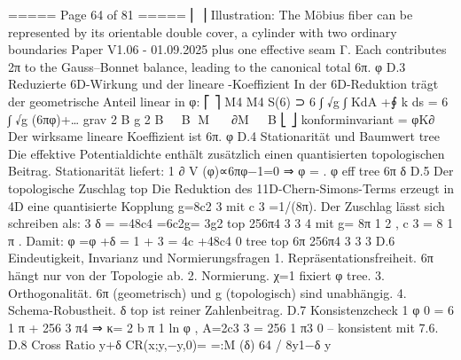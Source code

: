\begin{MyVerbatim}
{{===== Page 64 of 81 =====
⎢ ⎥
Illustration: The Möbius fiber can be represented by its orientable double cover, a cylinder with two ordinary boundaries
Paper V1.06 - 01.09.2025
plus one effective seam Γ. Each contributes 2π to the Gauss–Bonnet balance, leading to the canonical total 6π.
φ
D.3 Reduzierte 6D-Wirkung und der lineare -Koeffizient
In der 6D-Reduktion trägt der geometrische Anteil linear in φ:
⎡ ⎤
M4 M4
S(6) ⊃ 6 ∫ √g ∫ KdA +∮ k ds = 6 ∫ √g (6πφ)+…
grav 2 B g 2 B
B M  ∂M  B
⎣ ⎦
konforminvariant = φK∂
Der wirksame lineare Koeffizient ist 6π.
φ
D.4 Stationarität und Baumwert
tree
Die effektive Potentialdichte enthält zusätzlich einen quantisierten topologischen Beitrag. Stationarität liefert:
1
∂ V (φ)∝6πφ−1=0 ⇒ φ = .
φ eff tree 6π
δ
D.5 Der topologische Zuschlag
top
Die Reduktion des 11D-Chern-Simons-Terms erzeugt in 4D eine quantisierte Kopplung g=8c2 3 mit c 3 =1/(8π). Der
Zuschlag lässt sich schreiben als:
3
δ = =48c4 =6c2g= 3g2
top 256π4 3 3 4
mit g= 8π 1 2 , c 3 = 8 1 π .
Damit:
φ =φ +δ = 1 + 3 = 4c +48c4
0 tree top 6π 256π4 3 3 3
D.6 Eindeutigkeit, Invarianz und Normierungsfragen
1. Repräsentationsfreiheit. 6π hängt nur von der Topologie ab.
2. Normierung. χ=1 fixiert φ tree.
3. Orthogonalität. 6π (geometrisch) und g (topologisch) sind unabhängig.
4. Schema-Robustheit. δ top ist reiner Zahlenbeitrag.
D.7 Konsistenzcheck
1
φ 0 = 6 1 π + 256 3 π4 ⇒ κ= 2 b π 1 ln φ , A=2c3 3 = 256 1 π3
0
– konsistent mit 7.6.
D.8 Cross Ratio
y+δ
CR(x;y,−y,0)= =:M (δ)
64 / 8y1−δ y

}}
\end{MyVerbatim}
